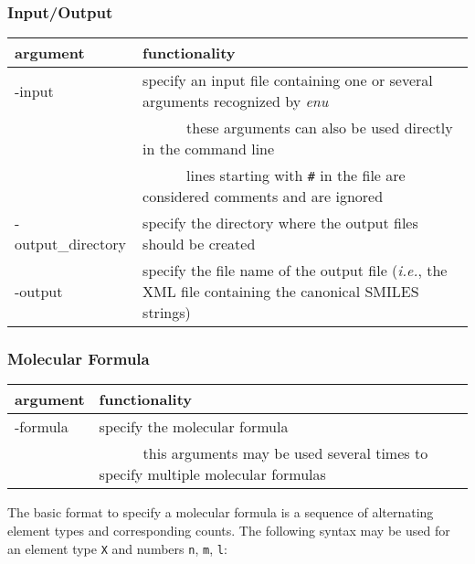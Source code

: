 \documentclass[a4paper,11pt]{article}
\newcommand{\tabitem}{~~\llap{\textbullet}~~}
\begin{document}
\subsubsection{Input/Output}
\begin{table}[H]
\begin{tabular}{>{\ttfamily}p{}|p{}}
    \hline
    \textnormal{argument} & functionality                                                                                  \\
    \hline\hline
    -input   & specify an input file containing one or several arguments recognized by \textit{enu}                   \\
             & ~~\tabitem these arguments can also be used directly in the command line                       \\
             & ~~\tabitem lines starting with \texttt{\#} in the file are considered comments and are ignored \\
    \hline
    -output\_directory & specify the directory where the output files should be created \\
    \hline
    -output & specify the file name of the output file (\textit{i.e.}, the XML file containing the canonical SMILES strings)\\
    \hline
\end{tabular}
\end{table}

\subsubsection{Molecular Formula}

\begin{table}[H]
\begin{tabular}{>{\ttfamily}p{}|p{}}
    \hline
    \textnormal{argument} & functionality                                                                                  \\
    \hline\hline
    -formula & specify the molecular formula \\
             & ~~\tabitem this arguments may be used several times to specify multiple molecular formulas \\
    \hline
\end{tabular}
\end{table}

The basic format to specify a molecular formula is a sequence of alternating element types and corresponding counts. The following syntax may be used for an element type \texttt{X} and numbers \texttt{n}, \texttt{m}, \texttt{l}:
\end{document}
